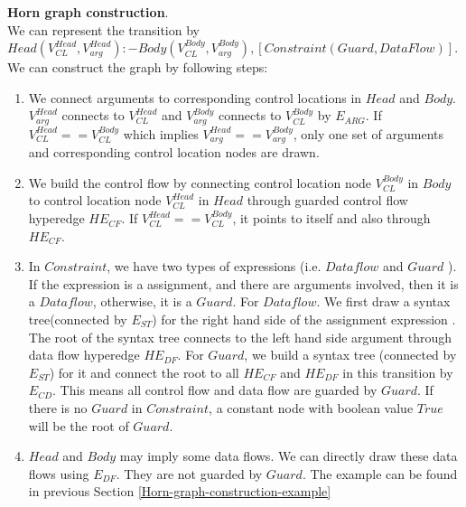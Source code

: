 \documentclass{article}
\begin{document}
\textbf{Horn graph construction}.\\
We can represent the transition by $Head(V_{CL}^{Head},V_{arg}^{Head}):-Body(V_{CL}^{Body},V_{arg}^{Body}),[Constraint(Guard, DataFlow)]$.
We can construct the graph by following steps:

\begin{enumerate}
  \item We connect arguments to corresponding control locations in $Head$ and $Body$. $V_{arg}^{Head}$ connects to $V_{CL}^{Head}$ and $V_{arg}^{Body}$ connects to $V_{CL}^{Body}$ by $E_{ARG}$. If $V_{CL}^{Head} == V_{CL}^{Body}$ which implies $V_{arg}^{Head} == V_{arg}^{Body}$, only one set of arguments and corresponding control location nodes are drawn.
  \item We build the control flow by connecting control location node $V_{CL}^{Body}$ in $Body$  to control location node $V_{CL}^{Head}$ in $Head$ through guarded control flow hyperedge $HE_{CF}$. If $V_{CL}^{Head} == V_{CL}^{Body}$, it points to itself and also through $HE_{CF}$.
  \item In $Constraint$, we have two types of expressions (i.e. $Dataflow$ and $Guard$ ). If the expression is a assignment, and there are arguments involved, then it is a $Dataflow$, otherwise, it is a $Guard$. For $Dataflow$. We first draw a syntax tree(connected by $E_{ST}$) for the right hand side of the assignment expression . The root of the syntax tree connects to the left hand side argument through data flow hyperedge $HE_{DF}$. For $Guard$, we build a syntax tree (connected by $E_{ST}$) for it and connect the root to all $HE_{CF}$ and $HE_{DF}$ in this transition by $E_{CD}$. This means all control flow and data flow are guarded by $Guard$.
      If there is no $Guard$ in $Constraint$, a constant node with boolean value $True$ will be the root of $Guard$.
  \item $Head$ and $Body$ may imply some data flows. We can directly draw these data flows using $E_{DF}$. They are not guarded by $Guard$. The example can be found in previous Section \ref{Horn-graph-construction-example}
\end{enumerate}
\end{document}
